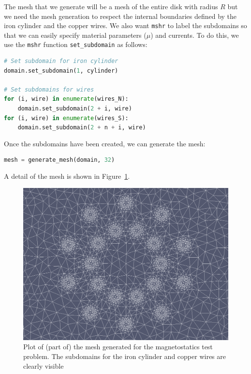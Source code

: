 \documentclass[graybox,envcountchap,sectrefs,final]{svmonodo}
\begin{document}
The mesh that we generate will be a mesh of the entire disk with
radius $R$ but we need the mesh generation to respect the internal
boundaries defined by the iron cylinder and the copper wires. We also
want \texttt{mshr} to label the subdomains so that we can easily specify
material parameters ($\mu$) and currents. To do this, we use the
\texttt{mshr} function \Verb!set_subdomain! as follows:

\begin{lstlisting}[language=Python,style=graycolor]
# Set subdomain for iron cylinder
domain.set_subdomain(1, cylinder)

# Set subdomains for wires
for (i, wire) in enumerate(wires_N):
    domain.set_subdomain(2 + i, wire)
for (i, wire) in enumerate(wires_S):
    domain.set_subdomain(2 + n + i, wire)
\end{lstlisting}
Once the subdomains have been created, we can generate the mesh:

\begin{lstlisting}[language=Python,style=graycolor]
mesh = generate_mesh(domain, 32)
\end{lstlisting}
A detail of the mesh is shown in Figure~\ref{ftut1:fig:magnetostatics:mesh}.


\begin{figure}[!ht]  %
  \centerline{\includegraphics[width=0.95\linewidth]{fig/magnetostatics_mesh.png}}
  \caption{
  Plot of (part of) the mesh generated for the magnetostatics test problem. The subdomains for the iron cylinder and copper wires are clearly visible \label{ftut1:fig:magnetostatics:mesh}
  }
\end{figure}
\end{document}
